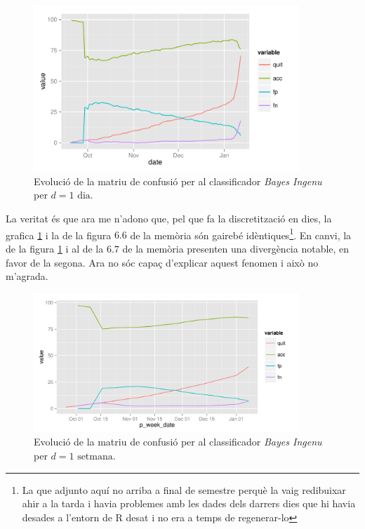 \documentclass[
	a4paper,
	twoside,
	justified
]{tufte-handout}
\begin{document}
\begin{figure}
\begin{center}
  \includegraphics[width=10cm]{naive_bayes_pred}
  \caption{
    \label{graph:naive_bayes_pred}
    Evolució de la matriu de confusió per al classificador \emph{Bayes Ingenu} per $d=\text{1 dia}$.
  }
\end{center}
\end{figure}

La veritat és que ara me n'adono que, pel que fa la discretització en dies, la grafica \ref{graph:naive_bayes_pred} i  la de la figura $6.6$ de la memòria són gairebé idèntiques\footnote{La que adjunto aquí no arriba a final de semestre perquè la vaig redibuixar ahir a la tarda i havia problemes amb les dades dels darrers dies que hi havia desades a l'entorn de R desat i no era a temps de regenerar-lo }. En canvi, la de la figura \ref{graph:naive_bayes_pred} i al de la $6.7$ de la memòria presenten una divergència notable, en favor de la segona. Ara no sóc capaç d'explicar aquest fenomen i això no m'agrada. 

\begin{figure}
\begin{center}
  \includegraphics[width=10cm]{naive_bayes_week_pred}
  \caption{
    \label{graph:naive_bayes_week_pred}
    Evolució de la matriu de confusió per al classificador \emph{Bayes Ingenu} per $d=\text{1 setmana}$.
  }
\end{center}
\end{figure}
\end{document}
